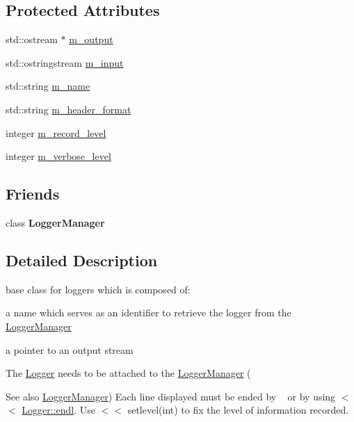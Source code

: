 \subsection*{Protected Attributes}
\begin{DoxyCompactItemize}
\item 
std\+::ostream $\ast$ \hyperlink{classez_1_1logging_1_1Logger_a5859fadb7d5a62e6f39a6a6dfc36d39b}{m\+\_\+output}
\item 
std\+::ostringstream \hyperlink{classez_1_1logging_1_1Logger_aa6583295cf06de1b03304c454cea4c54}{m\+\_\+input}
\item 
std\+::string \hyperlink{classez_1_1logging_1_1Logger_abf66c0dd07742763114cb5a25b3fe7cf}{m\+\_\+name}
\item 
std\+::string \hyperlink{classez_1_1logging_1_1Logger_a016718b598e4266d37ca95254945f4ba}{m\+\_\+header\+\_\+format}
\item 
integer \hyperlink{classez_1_1logging_1_1Logger_a89f9c24612c5f6dfcc9bec176cec4ee0}{m\+\_\+record\+\_\+level}
\item 
integer \hyperlink{classez_1_1logging_1_1Logger_a2e236ad54b47f938d0bea066ac7c2c00}{m\+\_\+verbose\+\_\+level}
\end{DoxyCompactItemize}
\subsection*{Friends}
\begin{DoxyCompactItemize}
\item 
\mbox{\label{classez_1_1logging_1_1Logger_ab315504a6dd6a6c8d2514affb54a9cf2}} 
class {\bfseries Logger\+Manager}
\end{DoxyCompactItemize}


\subsection{Detailed Description}
base class for loggers which is composed of\+: 
\begin{DoxyItemize}
\item a name which serves as an identifier to retrieve the logger from the \hyperlink{classez_1_1logging_1_1LoggerManager}{Logger\+Manager} 
\item a pointer to an output stream 
\end{DoxyItemize}The \hyperlink{classez_1_1logging_1_1Logger}{Logger} needs to be attached to the \hyperlink{classez_1_1logging_1_1LoggerManager}{Logger\+Manager} (\begin{DoxySeeAlso}{See also}
\hyperlink{classez_1_1logging_1_1LoggerManager}{Logger\+Manager}) Each line displayed must be ended by \textquotesingle{}~\newline
\textquotesingle{} or by using $<$$<$ \hyperlink{classez_1_1logging_1_1Logger_a69ba6cf7130aa70caeca9f5c8636e05a}{Logger\+::endl}. Use $<$$<$ setlevel(int) to fix the level of information recorded. 
\end{DoxySeeAlso}


